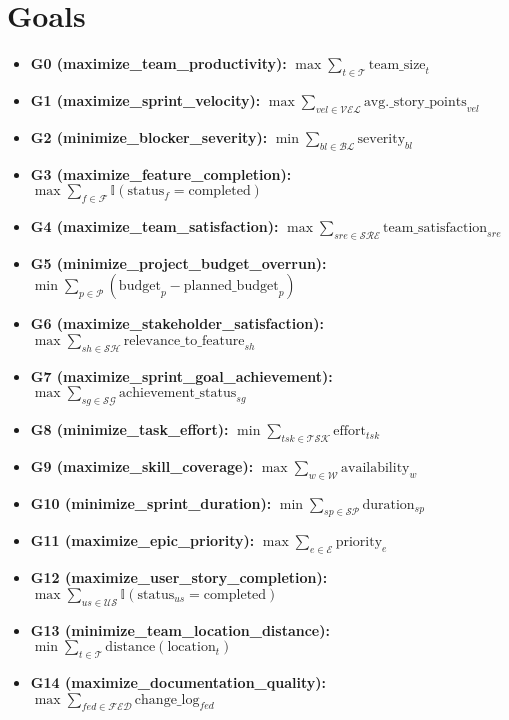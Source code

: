 \documentclass{article}
\begin{document}
\section{Goals}
\begin{itemize}
    \item \textbf{G0 (maximize\_team\_productivity):} $\max \sum_{t \in \mathcal{T}} \text{team\_size}_t$
    \item \textbf{G1 (maximize\_sprint\_velocity):} $\max \sum_{vel \in \mathcal{VEL}} \text{avg.\_story\_points}_{vel}$
    \item \textbf{G2 (minimize\_blocker\_severity):} $\min \sum_{bl \in \mathcal{BL}} \text{severity}_{bl}$
    \item \textbf{G3 (maximize\_feature\_completion):} $\max \sum_{f \in \mathcal{F}} \mathbb{I}(\text{status}_f = \text{completed})$
    \item \textbf{G4 (maximize\_team\_satisfaction):} $\max \sum_{sre \in \mathcal{SRE}} \text{team\_satisfaction}_{sre}$
    \item \textbf{G5 (minimize\_project\_budget\_overrun):} $\min \sum_{p \in \mathcal{P}} (\text{budget}_p - \text{planned\_budget}_p)$
    \item \textbf{G6 (maximize\_stakeholder\_satisfaction):} $\max \sum_{sh \in \mathcal{SH}} \text{relevance\_to\_feature}_{sh}$
    \item \textbf{G7 (maximize\_sprint\_goal\_achievement):} $\max \sum_{sg \in \mathcal{SG}} \text{achievement\_status}_{sg}$
    \item \textbf{G8 (minimize\_task\_effort):} $\min \sum_{tsk \in \mathcal{TSK}} \text{effort}_{tsk}$
    \item \textbf{G9 (maximize\_skill\_coverage):} $\max \sum_{w \in \mathcal{W}} \text{availability}_w$
    \item \textbf{G10 (minimize\_sprint\_duration):} $\min \sum_{sp \in \mathcal{SP}} \text{duration}_{sp}$
    \item \textbf{G11 (maximize\_epic\_priority):} $\max \sum_{e \in \mathcal{E}} \text{priority}_e$
    \item \textbf{G12 (maximize\_user\_story\_completion):} $\max \sum_{us \in \mathcal{US}} \mathbb{I}(\text{status}_{us} = \text{completed})$
    \item \textbf{G13 (minimize\_team\_location\_distance):} $\min \sum_{t \in \mathcal{T}} \text{distance}(\text{location}_t)$
    \item \textbf{G14 (maximize\_documentation\_quality):} $\max \sum_{fed \in \mathcal{FED}} \text{change\_log}_{fed}$
\end{itemize}
\end{document}
